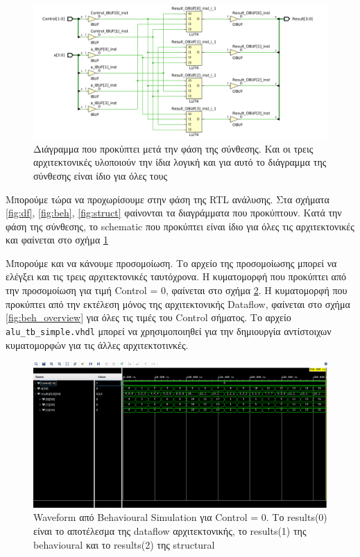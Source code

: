 \documentclass[11pt, a4paper]{report}
\begin{document}
\begin{figure}
  \includegraphics[width=\textwidth]{./images/alu-2/Synth_Schem_ALU_2.png}
  \caption{Διάγραμμα που προκύπτει μετά την φάση της σύνθεσης. Και οι τρεις αρχιτεκτονικές υλοποιούν την ίδια λογική και για αυτό το διάγραμμα της σύνθεσης είναι ίδιο για όλες τους}
  \label{fig:synth}
\end{figure}

Μπορούμε τώρα να προχωρίσουμε στην φάση της RTL ανάλυσης. Στα σχήματα \ref{fig:df}, \ref{fig:beh}, \ref{fig:struct} φαίνονται τα διαγράμματα που προκύπτουν.
Κατά την φάση της σύνθεσης, το schematic που προκύπτει είναι ίδιο για όλες τις αρχιτεκτονικές και φαίνεται στο σχήμα \ref{fig:synth}

Μπορούμε και να κάνουμε προσομοίωση. Το αρχείο της προσομοίωσης μπορεί να ελέγξει και τις τρεις αρχιτεκτονικές ταυτόχρονα.
Η κυματομορφή που προκύπτει από την προσομοίωση για τιμή Control = 0, φαίνεται στο σχήμα \ref{fig:beh_wfm_0}. 
Η κυματομορφή που προκύπτει από την εκτέλεση μόνος της αρχιτεκτονικής Dataflow, φαίνεται στο σχήμα \ref{fig:beh_overview} για όλες τις τιμές του Control σήματος.
Το αρχείο \texttt{alu_tb_simple.vhdl} μπορεί να χρησιμοποιηθεί για την δημιουργία αντίστοιχων κυματομορφών για τις άλλες αρχιτεκτοτινκές.

\begin{figure}
  \includegraphics[width=\textwidth]{./images/alu-2/beh-sim-0.png}
  \caption{Waveform από Behavioural Simulation για Control = 0. Το results(0) είναι το αποτέλεσμα της dataflow αρχιτεκτονικής, το results(1) της behavioural και το results(2) της structural}
  \label{fig:beh_wfm_0}
\end{figure}
\end{document}
